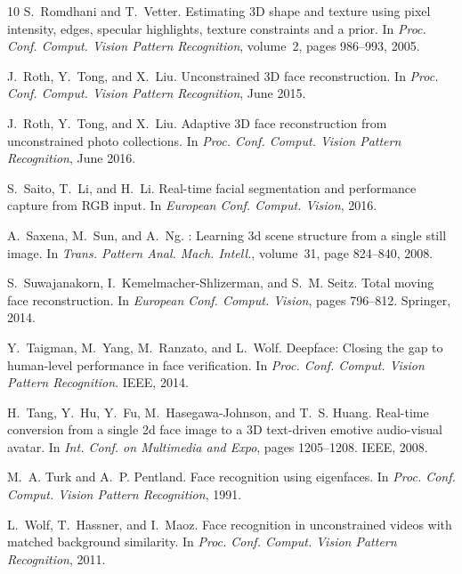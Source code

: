 \documentclass[10pt,twocolumn,letterpaper]{article}
\begin{document}
{\begin{thebibliography}{10}
S.~Romdhani and T.~Vetter.
\newblock Estimating {3D} shape and texture using pixel intensity, edges,
  specular highlights, texture constraints and a prior.
\newblock In {\em Proc. Conf. Comput. Vision Pattern Recognition}, volume~2,
  pages 986--993, 2005.

J.~Roth, Y.~Tong, and X.~Liu.
\newblock Unconstrained {3D} face reconstruction.
\newblock In {\em Proc. Conf. Comput. Vision Pattern Recognition}, June 2015.

J.~Roth, Y.~Tong, and X.~Liu.
\newblock Adaptive {3D} face reconstruction from unconstrained photo
  collections.
\newblock In {\em Proc. Conf. Comput. Vision Pattern Recognition}, June 2016.

S.~Saito, T.~Li, and H.~Li.
\newblock Real-time facial segmentation and performance capture from {RGB}
  input.
\newblock In {\em European Conf. Comput. Vision}, 2016.

A.~Saxena, M.~Sun, and A.~Ng.
: Learning 3d scene structure from a single still image.
\newblock In {\em Trans. Pattern Anal. Mach. Intell.}, volume~31, page
  824–840, 2008.

S.~Suwajanakorn, I.~Kemelmacher-Shlizerman, and S.~M. Seitz.
\newblock Total moving face reconstruction.
\newblock In {\em European Conf. Comput. Vision}, pages 796--812. Springer,
  2014.

Y.~Taigman, M.~Yang, M.~Ranzato, and L.~Wolf.
\newblock Deepface: Closing the gap to human-level performance in face
  verification.
\newblock In {\em Proc. Conf. Comput. Vision Pattern Recognition}. IEEE, 2014.

H.~Tang, Y.~Hu, Y.~Fu, M.~Hasegawa-Johnson, and T.~S. Huang.
\newblock Real-time conversion from a single 2d face image to a {3D}
  text-driven emotive audio-visual avatar.
\newblock In {\em Int. Conf. on Multimedia and Expo}, pages 1205--1208. IEEE,
  2008.

M.~A. Turk and A.~P. Pentland.
\newblock Face recognition using eigenfaces.
\newblock In {\em Proc. Conf. Comput. Vision Pattern Recognition}, 1991.

L.~Wolf, T.~Hassner, and I.~Maoz.
\newblock Face recognition in unconstrained videos with matched background
  similarity.
\newblock In {\em Proc. Conf. Comput. Vision Pattern Recognition}, 2011.


\end{thebibliography}}
\end{document}
